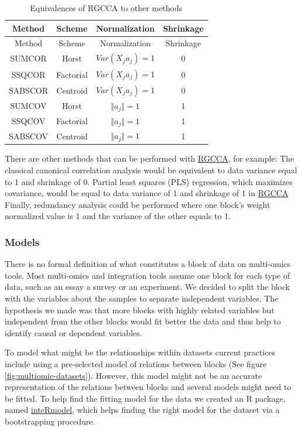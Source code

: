 \documentclass[
  12pt,
  a4paper,
  twoside,
  openright]{book}
\begin{document}
\begin{longtable}[]{@{}cccc@{}}
\caption{\label{tab:RGCCA-methods} Equivalences of RGCCA to other methods}\tabularnewline
\toprule
Method & Scheme & Normalization & Shrinkage \\
\midrule
\endfirsthead
\toprule
Method & Scheme & Normalization & Shrinkage \\
\midrule
\endhead
SUMCOR & Horst & \(Var(X_j a_j) = 1\) & 0 \\
SSQCOR & Factorial & \(Var(X_j a_j) = 1\) & 0 \\
SABSCOR & Centroid & \(Var(X_j a_j) = 1\) & 0 \\
SUMCOV & Horst & \(\Vert a_j \Vert = 1\) & 1 \\
SSQCOV & Factorial & \(\Vert a_j \Vert = 1\) & 1 \\
SABSCOV & Centroid & \(\Vert a_j \Vert = 1\) & 1 \\
\bottomrule
\end{longtable}

There are other methods that can be performed with \protect\hyperlink{acronyms_RGCCA}{RGCCA}, for example: The classical canonical correlation analysis would be equivalent to data variance equal to 1 and shrinkage of 0.
Partial least squares (PLS) regression, which maximizes covariance, would be equal to data variance of 1 and shrinkage of 1 in \protect\hyperlink{acronyms_RGCCA}{RGCCA}
Finally, redundancy analysis could be performed where one block's weight normalized value is 1 and the variance of the other equals to 1.

\hypertarget{models}{%
\subsubsection{Models}\label{models}}

There is no formal definition of what constitutes a block of data on multi-omics tools.
Most multi-omics and integration tools assume one block for each type of data, such as an essay a survey or an experiment.
We decided to split the block with the variables about the samples to separate independent variables.
The hypothesis we made was that more blocks with highly related variables but independent from the other blocks would fit better the data and thus help to identify causal or dependent variables.

To model what might be the relationships within datasets current practices include using a pre-selected model of relations between blocks (See figure \ref{fig:multiomic-datasets}).
However, this model might not be an accurate representation of the relations between blocks and several models might need to be fitted.
To help find the fitting model for the data we created an R package, named \href{https://llrs.github.io/inteRmodel/}{inteRmodel}, which helps finding the right model for the dataset via a bootstrapping procedure.
\end{document}
